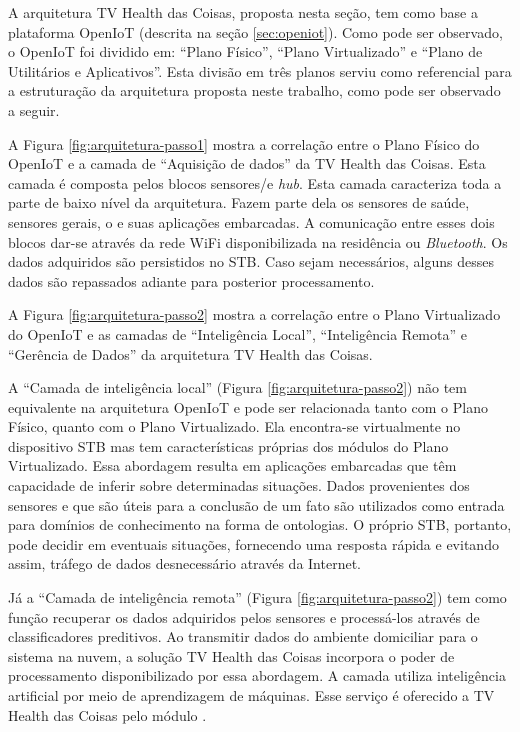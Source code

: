 A arquitetura TV Health das Coisas, proposta nesta seção, tem como base a
plataforma OpenIoT (descrita na seção \vref{sec:openiot}). Como pode ser
observado, o OpenIoT foi dividido em: ``Plano Físico'', ``Plano Virtualizado''
e ``Plano de Utilitários e Aplicativos''. Esta divisão em três planos serviu
como referencial para a estruturação da arquitetura proposta neste trabalho,
como pode ser observado a seguir.

A Figura \ref{fig:arquitetura-passo1} mostra a correlação entre o Plano Físico
do OpenIoT e a camada de ``Aquisição de dados'' da TV Health das Coisas. Esta
camada é composta pelos blocos sensores/\smartphones[] e \textit{hub}.  Esta
camada caracteriza toda a parte de baixo nível da arquitetura. Fazem parte dela
os sensores de saúde, sensores gerais, o \stb[] e suas aplicações embarcadas. A
comunicação entre esses dois blocos dar-se através da rede WiFi disponibilizada
na residência ou \textit{Bluetooth}. Os dados adquiridos são persistidos no
STB. Caso sejam necessários, alguns desses dados são repassados adiante para
posterior processamento. 


A Figura \ref{fig:arquitetura-passo2} mostra a correlação entre o Plano
Virtualizado do OpenIoT e as camadas de ``Inteligência Local'', ``Inteligência
Remota'' e ``Gerência de Dados'' da arquitetura TV Health das Coisas.


A ``Camada de inteligência local'' (Figura \ref{fig:arquitetura-passo2}) não tem equivalente na
arquitetura OpenIoT e pode ser relacionada tanto com o Plano Físico, quanto com
o Plano Virtualizado. Ela encontra-se virtualmente no dispositivo
STB mas tem características próprias dos módulos do Plano Virtualizado.
Essa abordagem resulta em aplicações embarcadas que têm capacidade de inferir sobre
determinadas situações. Dados provenientes dos sensores e que são úteis para a
conclusão de um fato são utilizados como entrada para domínios de conhecimento
na forma de ontologias. O próprio STB, portanto, pode decidir em eventuais
situações, fornecendo uma resposta rápida e evitando assim, tráfego de dados
desnecessário através da Internet.

Já a ``Camada de inteligência remota'' (Figura \ref{fig:arquitetura-passo2})
tem como função recuperar os dados adquiridos pelos sensores e processá-los
através de classificadores preditivos.  Ao transmitir dados do ambiente
domiciliar para o sistema na nuvem, a solução TV Health das Coisas incorpora o
poder de processamento disponibilizado por essa abordagem. A camada utiliza
inteligência artificial por meio de aprendizagem de máquinas. Esse serviço é
oferecido a TV Health das Coisas pelo módulo \nextsaude. 

